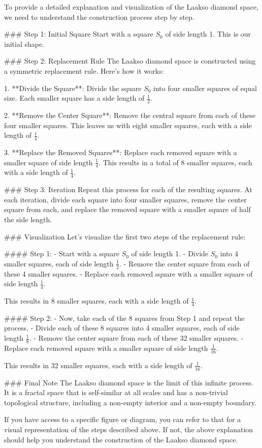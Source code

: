 To provide a detailed explanation and visualization of the Laakso diamond space, we need to understand the construction process step by step.

### Step 1: Initial Square
Start with a square \( S_0 \) of side length 1. This is our initial shape.

### Step 2: Replacement Rule
The Laakso diamond space is constructed using a symmetric replacement rule. Here's how it works:

1. **Divide the Square**: Divide the square \( S_0 \) into four smaller squares of equal size. Each smaller square has a side length of \( \frac{1}{2} \).

2. **Remove the Center Square**: Remove the central square from each of these four smaller squares. This leaves us with eight smaller squares, each with a side length of \( \frac{1}{4} \).

3. **Replace the Removed Squares**: Replace each removed square with a smaller square of side length \( \frac{1}{4} \). This results in a total of 8 smaller squares, each with a side length of \( \frac{1}{4} \).

### Step 3: Iteration
Repeat this process for each of the resulting squares. At each iteration, divide each square into four smaller squares, remove the center square from each, and replace the removed square with a smaller square of half the side length.

### Visualization
Let's visualize the first two steps of the replacement rule:

#### Step 1:
- Start with a square \( S_0 \) of side length 1.
- Divide \( S_0 \) into 4 smaller squares, each of side length \( \frac{1}{2} \).
- Remove the center square from each of these 4 smaller squares.
- Replace each removed square with a smaller square of side length \( \frac{1}{4} \).

This results in 8 smaller squares, each with a side length of \( \frac{1}{4} \).

#### Step 2:
- Now, take each of the 8 squares from Step 1 and repeat the process.
- Divide each of these 8 squares into 4 smaller squares, each of side length \( \frac{1}{8} \).
- Remove the center square from each of these 32 smaller squares.
- Replace each removed square with a smaller square of side length \( \frac{1}{16} \).

This results in 32 smaller squares, each with a side length of \( \frac{1}{16} \).

### Final Note
The Laakso diamond space is the limit of this infinite process. It is a fractal space that is self-similar at all scales and has a non-trivial topological structure, including a non-empty interior and a non-empty boundary.

If you have access to a specific figure or diagram, you can refer to that for a visual representation of the steps described above. If not, the above explanation should help you understand the construction of the Laakso diamond space.
